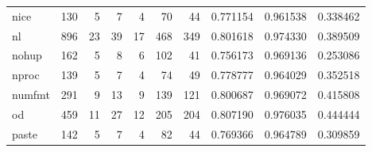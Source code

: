 \begin{tabular}{lrrrrrrrrr}
nice      &                    130 &                                  5 &                                 7 &                                4 &                                70 &                              44 &                                0.771154 &                               0.961538 &                             0.338462 \\
nl        &                    896 &                                 23 &                                39 &                               17 &                               468 &                             349 &                                0.801618 &                               0.974330 &                             0.389509 \\
nohup     &                    162 &                                  5 &                                 8 &                                6 &                               102 &                              41 &                                0.756173 &                               0.969136 &                             0.253086 \\
nproc     &                    139 &                                  5 &                                 7 &                                4 &                                74 &                              49 &                                0.778777 &                               0.964029 &                             0.352518 \\
numfmt    &                    291 &                                  9 &                                13 &                                9 &                               139 &                             121 &                                0.800687 &                               0.969072 &                             0.415808 \\
od        &                    459 &                                 11 &                                27 &                               12 &                               205 &                             204 &                                0.807190 &                               0.976035 &                             0.444444 \\
paste     &                    142 &                                  5 &                                 7 &                                4 &                                82 &                              44 &                                0.769366 &                               0.964789 &                             0.309859 \\

\end{tabular}
